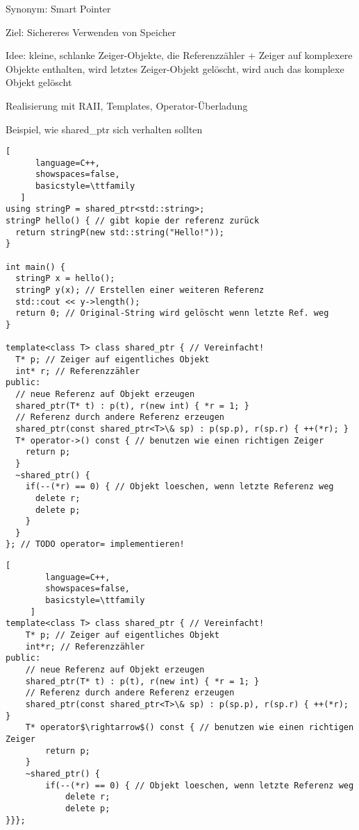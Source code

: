 \documentclass[10pt]{article}
\begin{document}
\begin{itemize*}
  \item Synonym: Smart Pointer
  \item Ziel: Sichereres Verwenden von Speicher
  \item Idee: kleine, schlanke Zeiger-Objekte, die Referenzzähler + Zeiger auf komplexere Objekte enthalten, wird letztes Zeiger-Objekt gelöscht, wird auch das komplexe Objekt gelöscht
  \item Realisierung mit RAII, Templates, Operator-Überladung
  \item Beispiel, wie shared\_ptr sich verhalten sollten
\end{itemize*}
\begin{lstlisting}[
      language=C++,
      showspaces=false,
      basicstyle=\ttfamily
   ]
using stringP = shared_ptr<std::string>;
stringP hello() { // gibt kopie der referenz zurück
  return stringP(new std::string("Hello!"));
}

int main() {
  stringP x = hello();
  stringP y(x); // Erstellen einer weiteren Referenz
  std::cout << y->length();
  return 0; // Original-String wird gelöscht wenn letzte Ref. weg
}

template<class T> class shared_ptr { // Vereinfacht!
  T* p; // Zeiger auf eigentliches Objekt
  int* r; // Referenzzähler
public:
  // neue Referenz auf Objekt erzeugen
  shared_ptr(T* t) : p(t), r(new int) { *r = 1; }
  // Referenz durch andere Referenz erzeugen
  shared_ptr(const shared_ptr<T>\& sp) : p(sp.p), r(sp.r) { ++(*r); }
  T* operator->() const { // benutzen wie einen richtigen Zeiger
    return p;
  }
  ~shared_ptr() {
    if(--(*r) == 0) { // Objekt loeschen, wenn letzte Referenz weg
      delete r;
      delete p;
    }
  }
}; // TODO operator= implementieren!
\end{lstlisting}

\begin{lstlisting}[
        language=C++,
        showspaces=false,
        basicstyle=\ttfamily
     ]
template<class T> class shared_ptr { // Vereinfacht!
    T* p; // Zeiger auf eigentliches Objekt
    int*r; // Referenzzähler
public:
    // neue Referenz auf Objekt erzeugen
    shared_ptr(T* t) : p(t), r(new int) { *r = 1; }
    // Referenz durch andere Referenz erzeugen
    shared_ptr(const shared_ptr<T>\& sp) : p(sp.p), r(sp.r) { ++(*r); }
    T* operator$\rightarrow$() const { // benutzen wie einen richtigen Zeiger
        return p;
    }
    ~shared_ptr() {
        if(--(*r) == 0) { // Objekt loeschen, wenn letzte Referenz weg
            delete r;
            delete p;
}}};
\end{lstlisting}
\end{document}
